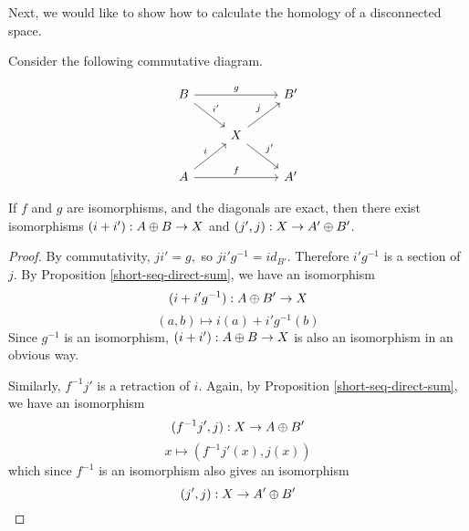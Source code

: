 Next, we would like to show how to calculate the homology of a disconnected space.

\begin{lemma}\label{dsum-lemma}
Consider the following commutative diagram.

\[\begin{tikzcd}
B \arrow[rr, "g"] \arrow[rd, "i'"] &                                    & B' \\
                                   & X \arrow[ru, "j"] \arrow[rd, "j'"] &    \\
A \arrow[ru, "i"] \arrow[rr, "f"]  &                                    & A'
\end{tikzcd}\]

If $f$ and $g$ are isomorphisms, and the diagonals are exact, then there exist isomorphisms $(i+i'):A\oplus B\rightarrow X$ and $(j',j):X\rightarrow A'\oplus B'$.
\end{lemma}
\begin{proof}
By commutativity, $ji'=g,$ so $ji'g^{-1}=id_{B'}$. Therefore $i'g^{-1}$ is a section of $j$. By Proposition \ref{short-seq-direct-sum}, we have an isomorphism $$(i+i'g^{-1}):A\oplus B'\rightarrow X$$
$$(a,b)\mapsto i(a)+i'g^{-1}(b)$$
Since $g^{-1}$ is an isomorphism, $(i+i'):A\oplus B\rightarrow X$ is also an isomorphism in an obvious way.

Similarly, $f^{-1}j'$ is a retraction of $i$. Again, by Proposition \ref{short-seq-direct-sum}, we have an isomorphism $$(f^{-1}j',j):X\rightarrow A\oplus B'$$
$$x\mapsto (f^{-1}j'(x),j(x))$$
which since $f^{-1}$ is an isomorphism also gives an isomorphism 
$$(j',j):X\rightarrow A'\oplus B'$$
\end{proof}


